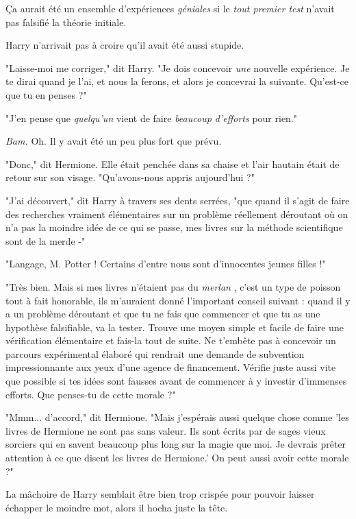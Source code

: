 Ça aurait été un ensemble d'expériences \emph{géniales}  si le \emph{tout premier test}  n'avait pas falsifié la théorie initiale.

Harry n'arrivait pas à croire qu'il avait été aussi stupide.

"Laisse-moi me corriger," dit Harry. "Je dois concevoir \emph{une}  nouvelle expérience. Je te dirai quand je l'ai, et nous la ferons, et alors je concevrai la suivante. Qu'est-ce que tu en penses ?"

"J'en pense que \emph{quelqu'un}  vient de faire \emph{beaucoup d'efforts}  pour rien."

\emph{Bam.}  Oh. Il y avait été un peu plus fort que prévu.

"Donc," dit Hermione. Elle était penchée dans sa chaise et l'air hautain était de retour sur son visage. "Qu'avons-nous appris aujourd'hui ?"

"J'ai découvert," dit Harry à travers ses dents serrées, "que quand il s'agit de faire des recherches vraiment élémentaires sur un problème réellement déroutant où on n'a pas la moindre idée de ce qui se passe, mes livres sur la méthode scientifique sont de la merde -"

"Langage, M. Potter ! Certains d'entre nous sont d'innocentes jeunes filles !"

"Très bien. Mais si mes livres n'étaient pas du \emph{merlan} , c'est un type de poisson tout à fait honorable, ils m'auraient donné l'important conseil suivant : quand il y a un problème déroutant et que tu ne fais que commencer et que tu as une hypothèse falsifiable, va la tester. Trouve une moyen simple et facile de faire une vérification élémentaire et fais-la tout de suite. Ne t'embête pas à concevoir un parcours expérimental élaboré qui rendrait une demande de subvention impressionnante aux yeux d'une agence de financement. Vérifie juste aussi vite que possible si tes idées sont fausses avant de commencer à y investir d'immenses efforts. Que penses-tu de cette morale ?"

"Mmm... d'accord," dit Hermione. "Mais j'espérais aussi quelque chose comme 'les livres de Hermione ne sont pas sans valeur. Ils sont écrits par de sages vieux sorciers qui en savent beaucoup plus long sur la magie que moi. Je devrais prêter attention à ce que disent les livres de Hermione.' On peut aussi avoir cette morale ?"

La mâchoire de Harry semblait être bien trop crispée pour pouvoir laisser échapper le moindre mot, alors il hocha juste la tête.

